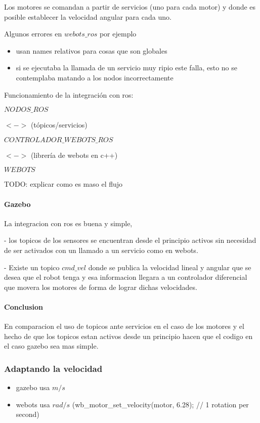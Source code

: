 Los motores se comandan a partir de servicios (uno para cada motor) y donde es posible establecer la velocidad angular para cada uno.

Algunos errores en $webots\_ros$ por ejemplo
\begin{itemize}
  \item usan names relativos para cosas que son globales
  \item si se ejecutaba la llamada de un servicio muy ripio este falla, esto no se contemplaba matando a los nodos incorrectamente
\end{itemize}

Funcionamiento de la integración con ros:

$NODOS\_ROS$

$<->$ (tópicos/servicios)

$CONTROLADOR\_WEBOTS\_ROS$

$<->$ (librería de webots en c++)

$WEBOTS$ 

TODO: explicar como es maso el flujo


\paragraph{Gazebo}
La integracion con ros es buena y simple, 

  - los topicos de los sensores se encuentran desde el principio activos sin necesidad de ser activados con un llamado a un servicio como en webots.

  - Existe un topico $cmd\_vel$ donde  se publica la velocidad lineal y angular que se desea que el robot tenga y esa informacion llegara a un controlador diferencial que movera los motores de forma de lograr dichas velocidades.

\paragraph{Conclusion}
En comparacion el uso de topicos ante servicios en el caso de los motores y el hecho de que los topicos estan activos desde un principio hacen que el codigo en el  caso gazebo sea mas simple.


\subsubsection{Adaptando la velocidad}
\begin{itemize}
  \item gazebo usa $m/s$
  \item webots usa $rad/s$ (wb\_motor\_set\_velocity(motor, 6.28);  // 1 rotation per second)
\end{itemize}

